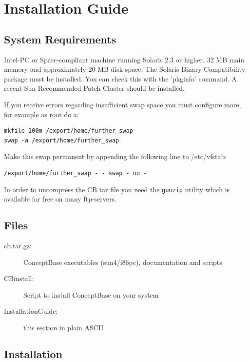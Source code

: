 




\chapter{Installation Guide}
\label{cha:installation guide}

\section{System Requirements}

Intel-PC or Sparc-compliant machine running Solaris 2.3 or higher.
32 MB main memory and approximately 20 MB disk space.
The Solaris Binary Compatibility package must be installed.
You can check this with the 'pkginfo' command.
A recent Sun Recommended Patch Cluster should be installed.

If you receive errors regarding insufficient swap space you
must configure more; for example as root do a:

\begin{verbatim}
mkfile 100m /export/home/further_swap
swap -a /export/home/further_swap
\end{verbatim}


Make this swap permanent by appending the following line
to /etc/vfstab:

\begin{verbatim}
/export/home/further_swap - - swap - no -
\end{verbatim}

In order to uncompress the CB tar file you need the
\verb+gunzip+ utility which is available for free on many ftp-servers.


\section{Files}

\begin{description}
\item[cb\relnrwodot .tar.gz:] ConceptBase executables (sun4/i86pc), documentation and scripts
\item[CBinstall:] Script to install ConceptBase on your system
\item[InstallationGuide:]   this section in plain ASCII
\end{description}

\section{Installation}


